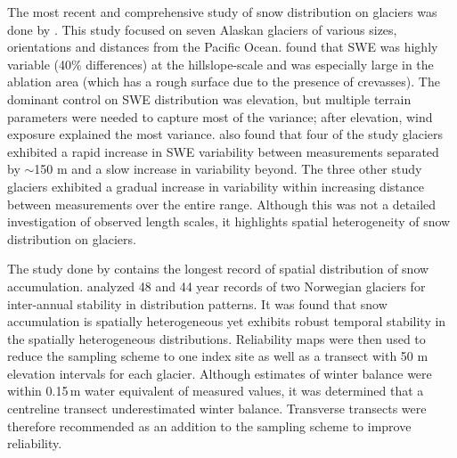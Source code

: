 \documentclass{sfuthesis}
\begin{document}
The most recent and comprehensive study of snow distribution on glaciers was done by \cite{McGrath2015}. This study focused on seven Alaskan glaciers of various sizes, orientations and distances from the Pacific Ocean. \cite{McGrath2015} found that SWE was highly variable (40$\%$ differences) at the hillslope-scale and was especially large in the ablation area (which has a rough surface due to the presence of crevasses). The dominant control on SWE distribution was elevation, but multiple terrain parameters were needed to capture most of the variance; after elevation, wind exposure explained the most variance. \cite{McGrath2015} also found that four of the study glaciers exhibited a rapid increase in SWE variability between measurements separated by $\sim$150 m and a slow increase in variability beyond. The three other study glaciers exhibited a gradual increase in variability within increasing distance between measurements over the entire range. Although this was not a detailed investigation of observed length scales, it highlights spatial heterogeneity of snow distribution on glaciers.

The study done by \cite{Walmsley2015} contains the longest record of spatial distribution of snow accumulation. \cite{Walmsley2015} analyzed 48 and 44 year records of two Norwegian glaciers for inter-annual stability in distribution patterns. It was found that snow accumulation is spatially heterogeneous yet exhibits robust temporal stability in the spatially heterogeneous distributions. Reliability maps were then used to reduce the sampling scheme to one index site as well as a transect with 50 m elevation intervals for each glacier. Although estimates of winter balance were within 0.15\,m water equivalent of measured values, it was determined that a centreline transect underestimated winter balance. Transverse transects were therefore recommended as an addition to the sampling scheme to improve reliability.
\end{document}
